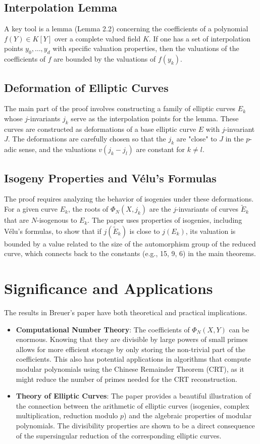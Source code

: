 \documentclass[12pt, a4paper]{article}
\theoremstyle{plain}
\theoremstyle{definition}
\begin{document}
\subsection{Interpolation Lemma}
A key tool is a lemma (Lemma 2.2) concerning the coefficients of a polynomial $f(Y) \in K[Y]$ over a complete valued field $K$. If one has a set of interpolation points $y_0, \dots, y_d$ with specific valuation properties, then the valuations of the coefficients of $f$ are bounded by the valuations of $f(y_k)$.

\subsection{Deformation of Elliptic Curves}
The main part of the proof involves constructing a family of elliptic curves $E_k$ whose $j$-invariants $j_k$ serve as the interpolation points for the lemma. These curves are constructed as deformations of a base elliptic curve $E$ with $j$-invariant $J$. The deformations are carefully chosen so that the $j_k$ are "close" to $J$ in the $p$-adic sense, and the valuations $v(j_k - j_l)$ are constant for $k \neq l$.

\subsection{Isogeny Properties and Vélu's Formulas}
The proof requires analyzing the behavior of isogenies under these deformations. For a given curve $E_k$, the roots of $\Phi_N(X, j_k)$ are the $j$-invariants of curves $\tilde{E}_k$ that are $N$-isogenous to $E_k$. The paper uses properties of isogenies, including Vélu's formulas, to show that if $j(\tilde{E}_k)$ is close to $j(E_k)$, its valuation is bounded by a value related to the size of the automorphism group of the reduced curve, which connects back to the constants (e.g., 15, 9, 6) in the main theorems.

\section{Significance and Applications}

The results in Breuer's paper have both theoretical and practical implications.
\begin{itemize}
    \item \textbf{Computational Number Theory}: The coefficients of $\Phi_N(X,Y)$ can be enormous. Knowing that they are divisible by large powers of small primes allows for more efficient storage by only storing the non-trivial part of the coefficients. This also has potential applications in algorithms that compute modular polynomials using the Chinese Remainder Theorem (CRT), as it might reduce the number of primes needed for the CRT reconstruction.
    \item \textbf{Theory of Elliptic Curves}: The paper provides a beautiful illustration of the connection between the arithmetic of elliptic curves (isogenies, complex multiplication, reduction modulo $p$) and the algebraic properties of modular polynomials. The divisibility properties are shown to be a direct consequence of the supersingular reduction of the corresponding elliptic curves.
\end{itemize}
\end{document}
